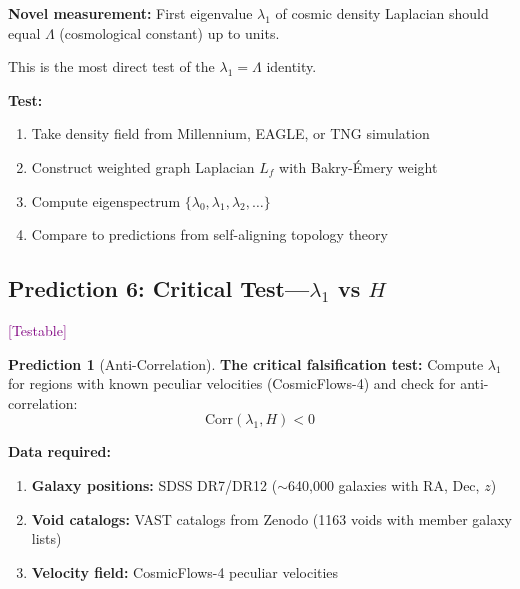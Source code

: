 \documentclass[11pt,a4paper]{article}
\theoremstyle{plain}
\theoremstyle{definition}
\newtheorem{prediction}[theorem]{Prediction}
\theoremstyle{remark}
\newcommand{\testable}{\textcolor{purple}{[Testable]}}
\begin{document}
\textbf{Novel measurement:} First eigenvalue $\lambda_1$ of cosmic density Laplacian should equal $\Lambda$ (cosmological constant) up to units.

This is the most direct test of the $\lambda_1 = \Lambda$ identity.

\textbf{Test:}
\begin{enumerate}[noitemsep]
    \item Take density field from Millennium, EAGLE, or TNG simulation
    \item Construct weighted graph Laplacian $L_f$ with Bakry-\'{E}mery weight
    \item Compute eigenspectrum $\{\lambda_0, \lambda_1, \lambda_2, \ldots\}$
    \item Compare to predictions from self-aligning topology theory
\end{enumerate}

\subsection{Prediction 6: Critical Test---$\lambda_1$ vs $H$} \testable

\begin{prediction}[Anti-Correlation]
\label{pred:critical}
\textbf{The critical falsification test:} Compute $\lambda_1$ for regions with known peculiar velocities (CosmicFlows-4) and check for anti-correlation:
\[
\text{Corr}(\lambda_1, H) < 0
\]
\end{prediction}

\begin{center}
\end{center}

\textbf{Data required:}
\begin{enumerate}[noitemsep]
    \item \textbf{Galaxy positions:} SDSS DR7/DR12 ($\sim$640,000 galaxies with RA, Dec, $z$)
    \item \textbf{Void catalogs:} VAST catalogs from Zenodo (1163 voids with member galaxy lists)
    \item \textbf{Velocity field:} CosmicFlows-4 peculiar velocities
\end{enumerate}
\end{document}
